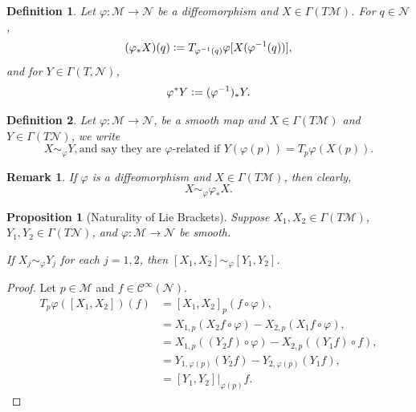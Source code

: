 \documentclass[8pt]{article}
\newtheorem{proposition}{Proposition}[section]
\newtheorem{definition}{Definition}[section]
\newtheorem{remark}{Remark}[section]
\newcommand{\defeq}{\vcentcolon=}
\newcommand{\M}[0]{\mathcal{M}}
\newcommand{\maniN}[0]{\mathcal{N}}
\begin{document}
\begin{definition}
Let $\varphi:\M\to\maniN$ be a diffeomorphism and $X\in\Gamma(T\M)$. For $q\in\maniN$,
\begin{equation*}
  (\varphi_*X)(q) \defeq T_{\varphi^{-1}(q)}\varphi[X(\varphi^{-1}(q))],
\end{equation*}
and for $Y\in\Gamma(T,\maniN)$,
\begin{equation*}
  \varphi^*Y\defeq (\varphi^{-1})_*Y.
\end{equation*}
\end{definition}

\begin{definition}
  Let $\varphi:\M\to\maniN$, be a smooth map and $X\in\Gamma(T\M)$ and $Y\in\Gamma(T\maniN)$, we write
  \begin{equation*}
    X\sim_\varphi Y, \text{and say they are $\varphi$-related if } Y (\varphi(p)) = T_p\varphi(X(p)).
  \end{equation*}
\end{definition}

\begin{remark}
  If $\varphi$ is a diffeomorphism and $X\in\Gamma(T\M)$, then clearly,
  \begin{equation*}
    X\sim_\varphi\varphi_*X.
  \end{equation*}
\end{remark}

\begin{proposition}[Naturality of Lie Brackets]
  Suppose $X_1,X_2\in \Gamma(T\M)$, $Y_1,Y_2\in\Gamma(T\maniN)$, and $\varphi:\M\to\maniN$ be smooth. 
  \par If $X_j\sim_\varphi Y_j$ for each $j=1,2$, then $[X_1,X_2]\sim_\varphi[Y_1,Y_2]$.
\end{proposition}

\begin{proof}
  Let $p\in\M$ and $f\in\mathcal{C}^\infty(\maniN)$. 
  \begin{align*}
    T_p\varphi([X_1,X_2])(f) &= [X_1,X_2]_p(f\circ \varphi),\\
     & = X_{1,p}(X_2f\circ\varphi)-X_{2,p}(X_1f\circ\varphi),\\
     & = X_{1,p}((Y_2f)\circ\varphi)-X_{2,p}((Y_1f)\circ f),\\
     & = Y_{1,\varphi(p)}(Y_2f)-Y_{2,\varphi(p)}(Y_1f),\\
     & = [Y_1,Y_2]|_{\varphi(p)}f.
  \end{align*}
\end{proof}
\end{document}
